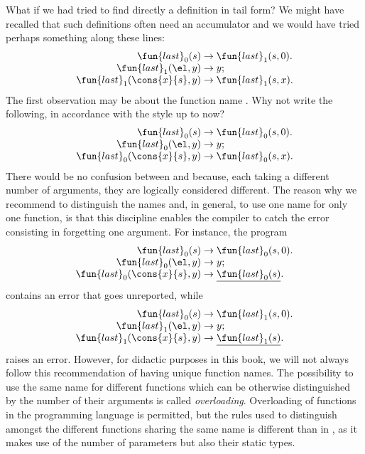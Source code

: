 What if we had tried to find directly a definition in tail form? We
might have recalled that such definitions often need an accumulator
and we would have tried perhaps something along these lines:
\begin{equation*}
\begin{array}{r@{\;}c@{\;}l}
\fun{last}_0(s) & \rightarrow & \fun{last}_1(s,0).\\
\fun{last}_1(\el,y) & \rightarrow & y;\\
\fun{last}_1(\cons{x}{s},y) & \rightarrow & \fun{last}_1(s,x).
\end{array}
\end{equation*}
The first observation may be about the function name
. Why not write the following, in accordance with the
style up to now?
\begin{equation*}
\begin{array}{r@{\;}c@{\;}l}
\fun{last}_0(s) & \rightarrow & \fun{last}_0(s,0).\\
\fun{last}_0(\el,y) & \rightarrow & y;\\
\fun{last}_0(\cons{x}{s},y) & \rightarrow & \fun{last}_0(s,x).
\end{array}
\end{equation*}
There would be no confusion between  and
 because, each taking a different number of
arguments, they are logically considered different. The reason why we
recommend to distinguish the names and, in general, to use one name
for only one function, is that this discipline enables the compiler to
catch the error consisting in forgetting one argument. For instance,
the program
\begin{equation*}
\begin{array}{r@{\;}c@{\;}l}
\fun{last}_0(s) & \rightarrow & \fun{last}_0(s,0).\\
\fun{last}_0(\el,y) & \rightarrow & y;\\
\fun{last}_0(\cons{x}{s},y) & \rightarrow &
\underline{\fun{last}_0(s)}.
\end{array}
\end{equation*}
contains an error that goes unreported, while
\begin{equation*}
\begin{array}{r@{\;}c@{\;}l}
\fun{last}_0(s) & \rightarrow & \fun{last}_1(s,0).\\
\fun{last}_1(\el,y) & \rightarrow & y;\\
\fun{last}_1(\cons{x}{s},y) & \rightarrow &
\underline{\fun{last}_1(s)}.
\end{array}
\end{equation*}
raises an error. However, for didactic purposes in this book, we will
not always follow this recommendation of having unique function
names. The possibility to use the same name for different functions
which can be otherwise distinguished by the number of their arguments
is called \emph{overloading}. Overloading of functions in the
programming language \Cpp is permitted, but the rules used to
distinguish amongst the different functions sharing the same name is
different than in \Erlang, as it makes use of the number of parameters
but also their static types.

